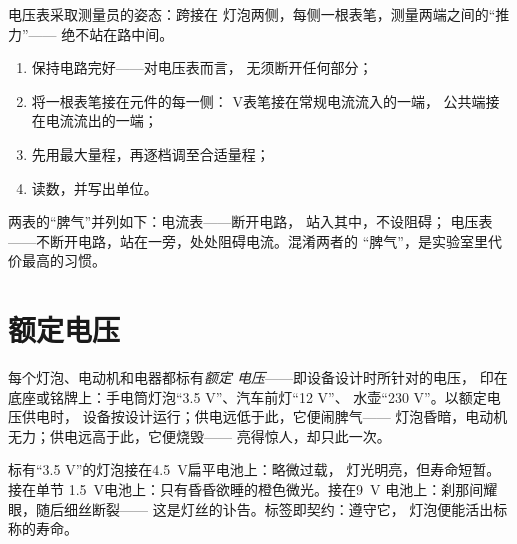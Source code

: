 \begin{omfigure}

{\small 电压表采取测量员的姿态：跨接在
灯泡两侧，每侧一根表笔，测量两端之间的“推力”——
绝不站在路中间。}
\end{omfigure}

\begin{method}[测量电压]\label{met:g8:voltage-voltmeter:measure}
\begin{enumerate}
  \item 保持电路完好——对电压表而言，
        无须断开任何部分；
  \item 将一根表笔接在元件的每一侧：
        \unit{V}表笔接在常规电流流入的一端，
        公共端接在电流流出的一端；
  \item 先用最大量程，再逐档调至合适量程；
  \item 读数，并写出单位。
\end{enumerate}
两表的“脾气”并列如下：电流表——断开电路，
站入其中，不设阻碍；
电压表——不断开电路，站在一旁，处处阻碍电流。混淆两者的
“脾气”，是实验室里代价最高的习惯。
\end{method}

\section{额定电压}

\begin{definition}[额定电压]\label{def:g8:voltage-voltmeter:nominal}
每个灯泡、电动机和电器都标有\emph{额定
电压}——即设备设计时所针对的电压，
印在底座或铭牌上：手电筒灯泡“3.5 V”、汽车前灯“12 V”、
水壶“230 V”。以额定电压供电时，
设备按设计运行；供电远低于此，它便闹脾气——
灯泡昏暗，电动机无力；供电远高于此，它便烧毁——
亮得惊人，却只此一次。
\end{definition}

\begin{example}[灯泡与电池的匹配]\label{ex:g8:voltage-voltmeter:matching}
标有“3.5 V”的灯泡接在\qty{4.5}{V}扁平电池上：略微过载，
灯光明亮，但寿命短暂。接在单节
\qty{1.5}{V}电池上：只有昏昏欲睡的橙色微光。接在\qty{9}{V}
电池上：刹那间耀眼，随后细丝断裂——
这是灯丝的讣告。标签即契约：遵守它，
灯泡便能活出标称的寿命。
\end{example}

